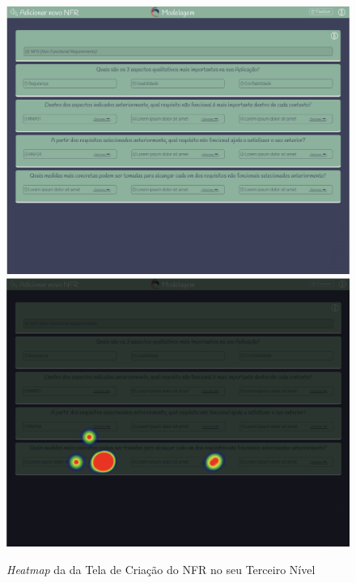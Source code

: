 \begin{figure}[]
  \begin{center}
      \caption{{\textit{Heatmap} da da Tela de Criação do NFR no seu Terceiro Nível}}
      \label{fig:nfr_hm_4}
      \includegraphics[scale=0.45]{figuras/UsabilityHub/nfr/7.png}
      \includegraphics[scale=0.45]{figuras/UsabilityHub/nfr/8.png}
  \end{center}
\end{figure}

